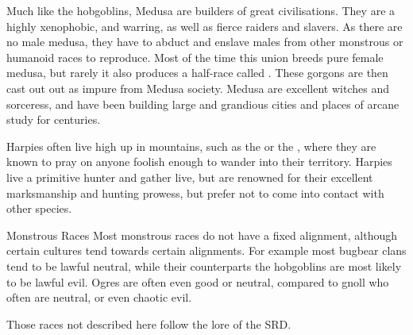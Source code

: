 Much like the hobgoblins, Medusa are builders of great civilisations. They are
a highly xenophobic, and warring, as well as fierce raiders and slavers. As
there are no male medusa, they have to abduct and enslave males from other
monstrous or humanoid races to reproduce. Most of the time this union breeds
pure female medusa, but rarely it also produces a half-race called
. These gorgons are then cast out out as impure from
Medusa society. Medusa are excellent witches and sorceress, and have been
building large and grandious cities and places of arcane study for centuries.

Harpies often live high up in mountains, such as the 
or the , where they are known to pray on anyone
foolish enough to wander into their territory. Harpies live a primitive hunter
and gather live, but are renowned for their excellent marksmanship and hunting
prowess, but prefer not to come into contact with other species.

\begin{35e}{Monstrous Races}
  Most monstrous races do not have a fixed alignment, although certain
  cultures tend towards certain alignments. For example most bugbear clans
  tend to be lawful neutral, while their counterparts the hobgoblins are most
  likely to be lawful evil. Ogres are often even good or neutral, compared to
  gnoll who often are neutral, or even chaotic evil.

  Those races not described here follow the lore of the SRD.
\end{35e}
